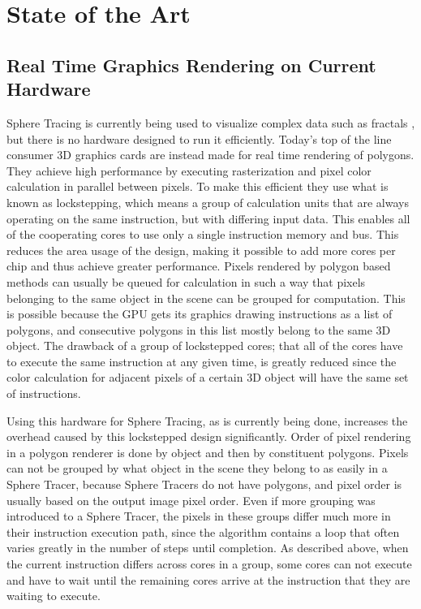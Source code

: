 \chapter{State of the Art}

	\section{ Real Time Graphics Rendering on Current Hardware } 

		Sphere Tracing is currently being used to visualize complex data such
		as fractals \cite{JONATHANGRANSKOG2017}, but there is no hardware
		designed to run	it efficiently. Today's top of the line consumer 3D
		graphics cards are instead made for real time rendering of
		polygons\cite{Houston2010}. They achieve high performance by
		executing rasterization and pixel color calculation in parallel
		between pixels. To make this efficient they use what is known as
		lockstepping, which means a group of calculation units that are
		always operating on the same instruction, but with differing input
		data. This enables all of the cooperating cores to use only a single
		instruction memory and bus. This reduces the area usage of the
		design, making it possible to add more cores per chip and thus
		achieve greater performance. Pixels rendered by polygon based methods
		can usually be queued for calculation in such a way that pixels
		belonging to the same object in the scene can be grouped for
		computation. This is possible because the GPU gets its graphics
		drawing instructions as a list of polygons, and consecutive polygons
		in this list mostly belong to the same 3D object. The drawback of a
		group of lockstepped cores; that all of the cores have to execute the
		same instruction at any given time, is greatly reduced since the
		color calculation for adjacent pixels of a certain 3D object will
		have the same set of instructions.
		
		Using this hardware for Sphere Tracing, as is currently being done,
		increases the overhead caused by this lockstepped design significantly.
		Order of pixel rendering in a polygon renderer is done by object and
		then by constituent polygons. Pixels can not be grouped by what object
		in the scene they belong to as easily in a Sphere Tracer, because Sphere
		Tracers do not have polygons, and pixel order is usually based on the
		output image pixel order. Even if more grouping was introduced to a
		Sphere Tracer, the pixels in these groups differ much more in their
		instruction execution path, since the algorithm contains a loop that
		often varies greatly in the number of steps until completion. As
		described above, when the current instruction differs across cores in a
		group, some cores can not execute and have to wait until the remaining
		cores arrive at the instruction that they are waiting to execute.
		
